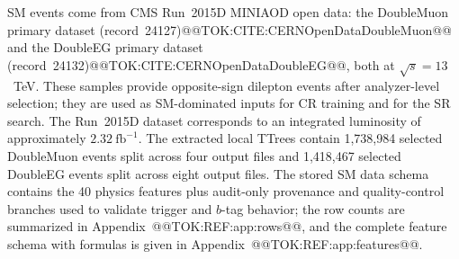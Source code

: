 \documentclass[11pt]{article}
\begin{document}
SM events come from CMS Run~2015D MINIAOD open data: the DoubleMuon primary dataset
(record~24127)@@TOK:CITE:CERNOpenDataDoubleMuon@@ and the DoubleEG primary dataset
(record~24132)@@TOK:CITE:CERNOpenDataDoubleEG@@, both at $\sqrt{s}=13$~TeV.
These samples provide opposite-sign dilepton events after analyzer-level selection;
they are used as SM-dominated inputs for CR training and for the SR search.
The Run~2015D dataset corresponds to an integrated luminosity of approximately
$2.32~\mathrm{fb}^{-1}$.
The extracted local TTrees contain 1,738,984 selected DoubleMuon events split across four
output files and 1,418,467 selected DoubleEG events split across eight output files.
The stored SM data schema contains the 40 physics features plus audit-only provenance and
quality-control branches used to validate trigger and $b$-tag behavior; the row counts are
summarized in Appendix~@@TOK:REF:app:rows@@, and the complete feature schema with formulas is
given in Appendix~@@TOK:REF:app:features@@.
\end{document}
